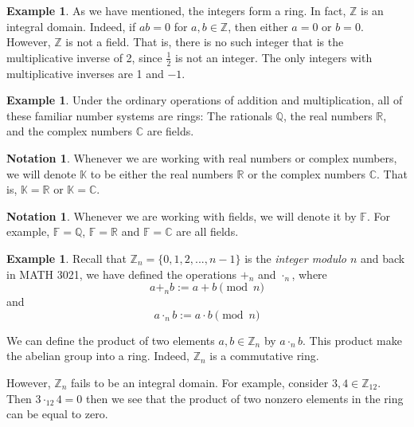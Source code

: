 \documentclass[11pt]{book}
\theoremstyle{definition}\newtheorem{definition}[subsection]{Definition}
\theoremstyle{definition}\newtheorem{example}[subsection]{Example}
\theoremstyle{definition}\newtheorem{notation}[subsection]{Notation}
\theoremstyle{definition}\newtheorem{remark}[subsection]{Remark}
\theoremstyle{theorem}\newtheorem{theorem}[subsection]{Theorem}
\theoremstyle{theorem}\newtheorem{lemma}[subsection]{Lemma}
\theoremstyle{theorem}\newtheorem{proposition}[subsection]{Proposition}
\theoremstyle{theorem}\newtheorem{corollary}[subsection]{Corollary}
\newcommand{\K}{\mathbb{K}}
\newcommand{\C}{\mathbb{C}}
\newcommand{\R}{\mathbb{R}}
\newcommand{\Q}{\mathbb{Q}}
\newcommand{\Z}{\mathbb{Z}}
\newcommand{\F}{\mathbb{F}}
\begin{document}
\begin{example}\label{example:1.1.7}
    As we have mentioned, the integers form a ring. In fact, $\Z$ is an integral domain. Indeed, if $ab = 0$ for $a, b \in \Z$, then either $a = 0$ or $b = 0$. However, $\Z$ is not a field. That is, there is no such integer that is the multiplicative inverse of 2, since $\frac{1}{2}$ is not an integer. The only integers with multiplicative inverses are 1 and $-1$.
\end{example}

\begin{example}\label{example:1.1.8}    
    Under the ordinary operations of addition and multiplication, all of these familiar number systems are rings: The rationals $\Q$, the real numbers $\R$, and the complex numbers $\C$ are fields.
\end{example}

\begin{notation}\label{notation:1.1.9}
    Whenever we are working with real numbers or complex numbers, we will denote $\K$ to be either the real numbers $\R$ or the complex numbers $\C$. That is, $\K = \R$ or $\K = \C$.
\end{notation}

\begin{notation}\label{notation:1.1.10}
    Whenever we are working with fields, we will denote it by $\F$. For example, $\F = \Q$, $\F = \R$ and $\F = \C$ are all fields.
\end{notation}

\begin{example}\label{example:1.1.11}   
    Recall that $\Z_n = \{0, 1, 2,..., n - 1\}$ is the \emph{integer modulo $n$} and back in MATH 3021, we have defined the operations $+_n$ and $\cdot_n$, where
    \begin{equation*}
        a +_n b := a + b \pmod n
    \end{equation*}
    and
    \begin{equation*}
        a \cdot_n b := a \cdot b \pmod n
    \end{equation*}
    
    We can define the product of two elements $a, b \in \Z_n$ by $a \cdot_n b$. This product make the abelian group into a ring. Indeed, $\Z_n$ is a commutative ring.

    However, $\Z_n$ fails to be an integral domain. For example, consider $3, 4 \in \Z_{12}$. Then $3 \cdot_{12} 4 = 0$ then we see that the product of two nonzero elements in the ring can be equal to zero.
\end{example}
\end{document}
